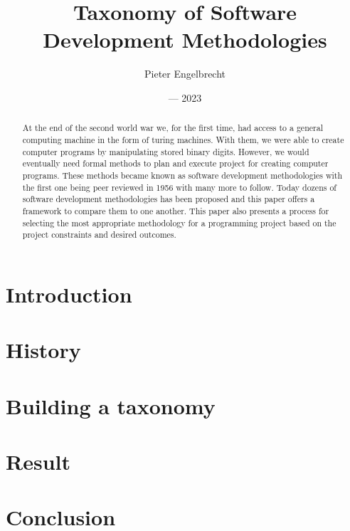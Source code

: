 \documentclass{article}
\title{Taxonomy of Software Development Methodologies}
\author{Pieter Engelbrecht}
\date{--- 2023}
\begin{document}
\maketitle

\begin{abstract}
  At the end of the second world war we, for the first time, had access to a general computing machine in the form of turing machines.
  With them, we were able to create computer programs by manipulating stored binary digits.
  However, we would eventually need formal methods to plan and execute project for creating computer programs.
  These methods became known as software development methodologies with the first one being peer reviewed in 1956 with many more to follow.
  Today dozens of software development methodologies has been proposed and this paper offers a framework to compare them to one another.
  This paper also presents a process for selecting the most appropriate methodology for a programming project based on the project constraints and desired outcomes.
\end{abstract}

\section{Introduction}
\section{History}
\section{Building a taxonomy}
\section{Result}
\section{Conclusion}
\end{document}
